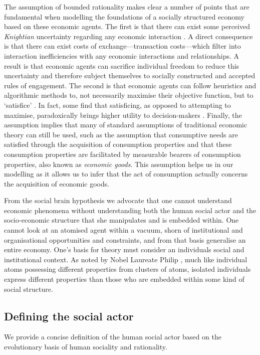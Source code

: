 The assumption of bounded rationality makes clear a number of points that are fundamental when modelling the foundations of a socially structured economy based on these economic agents. The first is that there can exist some perceived \emph{Knightian} uncertainty regarding any economic interaction \citep{Knight1921}. A direct consequence is that there can exist costs of exchange---transaction costs---which filter into interaction inefficiencies with any economic interactions and relationships. A result is that economic agents can sacrifice individual freedom to reduce this uncertainty and therefore subject themselves to socially constructed and accepted rules of engagement. The second is that economic agents can follow heuristics and algorithmic methods to, not necessarily maximise their objective function, but to `satisfice' \citep{Simon1947, Simon1956}. In fact, some find that satisficing, as opposed to attempting to maximise, paradoxically brings higher utility to decision-makers \citep{Schwartz2002}. Finally, the assumption implies that many of standard assumptions of traditional economic theory can still be used, such as the assumption that consumptive needs are satisfied through the acquisition of consumption properties and that these consumption properties are facilitated by measurable bearers of consumption properties, also known as \emph{economic goods}. This assumption helps us in our modelling as it allows us to infer that the act of consumption actually concerns the acquisition of economic goods.

From the social brain hypothesis we advocate that one cannot understand economic phenomena without understanding both the human social actor and the socio-economic structure that she manipulates and is embedded within. One cannot look at an atomised agent within a vacuum, shorn of institutional and organisational opportunities and constraints, and from that basis generalise an entire economy. One's basis for theory must consider an individuals social and institutional context. As noted by Nobel Laureate Philip \citet{Anderson1972}, much like individual atoms possessing different properties from clusters of atoms, isolated individuals express different properties than those who are embedded within some kind of social structure.

\subsection{Defining the social actor}

We provide a concise definition of the human social actor based on the evolutionary basis of human sociality and rationality.

